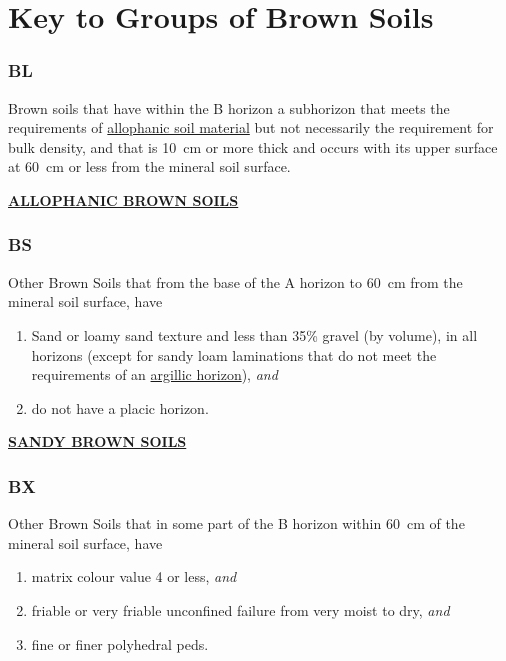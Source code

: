 \documentclass[
  letterpaper,
  DIV=11,
  numbers=noendperiod]{scrreprt}
\providecommand{\tightlist}{%
  \setlength{\itemsep}{0pt}\setlength{\parskip}{0pt}}\usepackage{longtable,booktabs,array}
\begin{document}
\hypertarget{sec-grp-B}{%
\section{Key to Groups of Brown Soils}\label{sec-grp-B}}

\hypertarget{sec-key-BL}{%
\subsubsection{\texorpdfstring{\textbf{BL}}{BL}}\label{sec-key-BL}}

Brown soils that have within the B horizon a subhorizon that meets the
requirements of \protect\hyperlink{sec-diag-alloph}{allophanic soil
material} but not necessarily the requirement for bulk density, and that
is 10~cm or more thick and occurs with its upper surface at 60~cm or
less from the mineral soil surface.

\protect\hyperlink{sec-BL}{\textbf{ALLOPHANIC BROWN SOILS}}

\hypertarget{sec-key-BS}{%
\subsubsection{\texorpdfstring{\textbf{BS}}{BS}}\label{sec-key-BS}}

Other Brown Soils that from the base of the A horizon to 60~cm from the
mineral soil surface, have

\begin{enumerate}
\def\labelenumi{\arabic{enumi}.}
\tightlist
\item
  Sand or loamy sand texture and less than 35\% gravel (by volume), in
  all horizons (except for sandy loam laminations that do not meet the
  requirements of an \protect\hyperlink{sec-diag-argh}{argillic
  horizon}), \emph{and}
\item
  do not have a placic horizon.
\end{enumerate}

\protect\hyperlink{sec-BS}{\textbf{SANDY BROWN SOILS}}

\hypertarget{sec-key-BX}{%
\subsubsection{\texorpdfstring{\textbf{BX}}{BX}}\label{sec-key-BX}}

Other Brown Soils that in some part of the B horizon within 60~cm of the
mineral soil surface, have

\begin{enumerate}
\def\labelenumi{\arabic{enumi}.}
\tightlist
\item
  matrix colour value 4 or less, \emph{and}
\item
  friable or very friable unconfined failure from very moist to dry,
  \emph{and}
\item
  fine or finer polyhedral peds.
\end{enumerate}
\end{document}
